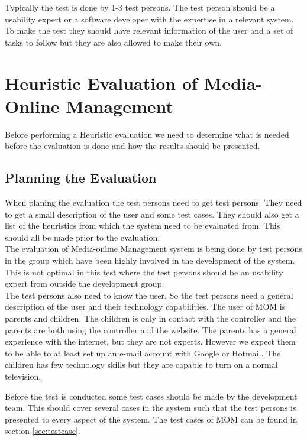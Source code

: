 Typically the test is done by 1-3 test persons\citep{HeuristicEvaluation}. The test person should be a usability expert or a software developer with the expertise in a relevant system. To make the test they should have relevant information of the user and a set of tasks to follow but they are also allowed to make their own.


\section{Heuristic Evaluation of Media-Online Management}
Before performing a Heuristic evaluation we need to determine what is needed before the evaluation is done and how the results should be presented\citep{HeuristicEvaluationGuide}.

\subsection{Planning the Evaluation}
When planing the evaluation the test persons need to get test persons. They need to get a small description of the user and some test cases. They should also get a list of the heuristics from which the system need to be evaluated from. This should all be made prior to the evaluation. \\

The evaluation of Media-online Management system is being done by test persons in the group which have been highly involved in the development of the system. This is not optimal in this test where the test persons should be an usability expert from outside the development group\citep{DIEB}.\\

The test persons also need to know the user. So the test persons need a general description of the user and their technology capabilities. The user of MOM is parents and children. The children is only in contact with the controller and the parents are both using the controller and the website. The parents has a general experience with the internet, but they are not experts. However we expect them to be able to at least set up an e-mail account with Google or Hotmail. The children has few technology skills but they are capable to turn on a normal television. \\

Before the test is conducted some test cases should be made by the development team. This should cover several cases in the system such that the test persons is presented to every aspect of the system. The test cases of MOM can be found in section \vref{sec:testcase}.\\ 


